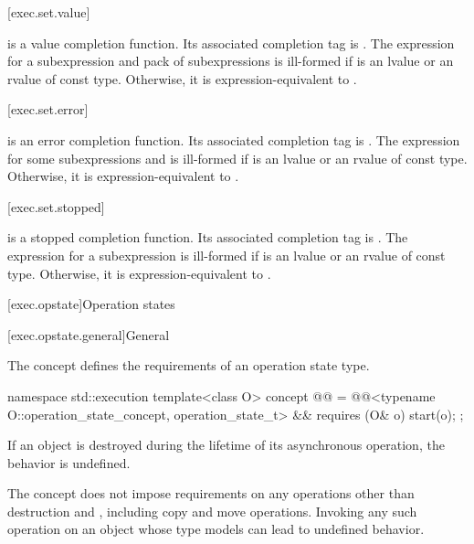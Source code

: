 [exec.set.value]{}

\pnum
{} is a value completion function.
Its associated completion tag is .
The expression 
for a subexpression  and
pack of subexpressions  is ill-formed
if  is an lvalue or an rvalue of const type.
Otherwise, it is expression-equivalent to
.

[exec.set.error]{}

\pnum
{} is an error completion function.
Its associated completion tag is .
The expression 
for some subexpressions  and  is ill-formed
if  is an lvalue or an rvalue of const type.
Otherwise, it is expression-equivalent to
.

[exec.set.stopped]{}

\pnum
{} is a stopped completion function.
Its associated completion tag is .
The expression 
for a subexpression  is ill-formed
if  is an lvalue or an rvalue of const type.
Otherwise, it is expression-equivalent to
.

[exec.opstate]{Operation states}

[exec.opstate.general]{General}

\pnum
The  concept defines
the requirements of an operation state type.
\begin{codeblock}
namespace std::execution {
  template<class O>
    concept @@ =
      @@<typename O::operation_state_concept, operation_state_t> &&
      requires (O& o) {
        start(o);
      };
}
\end{codeblock}

\pnum
If an  object is destroyed
during the lifetime of its asynchronous operation,
the behavior is undefined.
\begin{note}
The  concept does not impose requirements
on any operations other than destruction and ,
including copy and move operations.
Invoking any such operation on an object
whose type models  can lead to undefined behavior.
\end{note}


